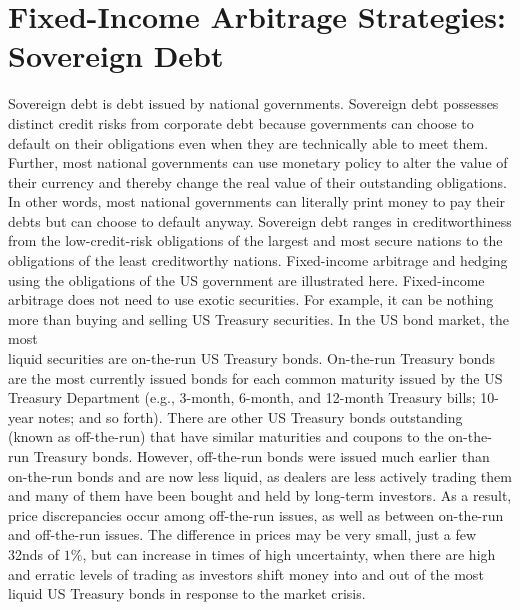 \documentclass[11pt]{article}
\begin{document}
\section*{Fixed-Income Arbitrage Strategies: Sovereign Debt}
Sovereign debt is debt issued by national governments. Sovereign debt possesses distinct credit risks from corporate debt because governments can choose to default on their obligations even when they are technically able to meet them. Further, most national governments can use monetary policy to alter the value of their currency and thereby change the real value of their outstanding obligations. In other words, most national governments can literally print money to pay their debts but can choose to default anyway. Sovereign debt ranges in creditworthiness from the low-credit-risk obligations of the largest and most secure nations to the obligations of the least creditworthy nations. Fixed-income arbitrage and hedging using the obligations of the US government are illustrated here. Fixed-income arbitrage does not need to use exotic securities. For example, it can be nothing more than buying and selling US Treasury securities. In the US bond market, the most\\
liquid securities are on-the-run US Treasury bonds. On-the-run Treasury bonds are the most currently issued bonds for each common maturity issued by the US Treasury Department (e.g., 3-month, 6-month, and 12-month Treasury bills; 10-year notes; and so forth). There are other US Treasury bonds outstanding (known as off-the-run) that have similar maturities and coupons to the on-the-run Treasury bonds. However, off-the-run bonds were issued much earlier than on-the-run bonds and are now less liquid, as dealers are less actively trading them and many of them have been bought and held by long-term investors. As a result, price discrepancies occur among off-the-run issues, as well as between on-the-run and off-the-run issues. The difference in prices may be very small, just a few 32nds of $1 \%$, but can increase in times of high uncertainty, when there are high and erratic levels of trading as investors shift money into and out of the most liquid US Treasury bonds in response to the market crisis.
\end{document}
